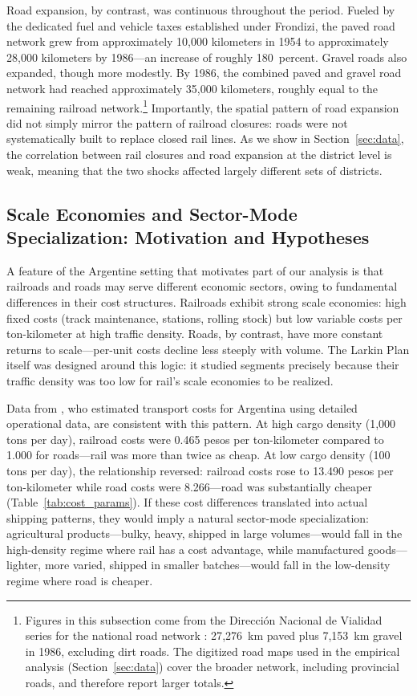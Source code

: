 Road expansion, by contrast, was continuous throughout the period.
Fueled by the dedicated fuel and vehicle taxes established under
Frondizi, the paved road network grew from approximately
10{,}000 kilometers in 1954 to approximately 28{,}000 kilometers by
1986—an increase of roughly 180~percent. Gravel roads also expanded,
though more modestly. By 1986, the combined paved and gravel road
network had reached approximately 35{,}000 kilometers, roughly equal
to the remaining railroad network.\footnote{Figures in this
subsection come from the Dirección Nacional de Vialidad series for
the national road network \citep{dnvseries}: 27{,}276~km paved plus
7{,}153~km gravel in 1986, excluding dirt roads. The digitized road
maps used in the empirical analysis (Section~\ref{sec:data}) cover
the broader network, including provincial roads, and therefore
report larger totals.} Importantly, the spatial pattern
of road expansion did not simply mirror the pattern of railroad
closures: roads were not systematically built to replace closed rail
lines. As we show in Section~\ref{sec:data}, the correlation between
rail closures and road expansion at the district level is weak,
meaning that the two shocks affected largely different sets of
districts.

\subsection{Scale Economies and Sector-Mode Specialization:
            Motivation and Hypotheses}
\label{ssec:scale_economies}

A feature of the Argentine setting that motivates part of our
analysis is that railroads and roads may serve different economic
sectors, owing to fundamental differences in their cost structures.
Railroads exhibit strong scale economies: high fixed costs (track
maintenance, stations, rolling stock) but low variable costs per
ton-kilometer at high traffic density. Roads, by contrast, have more
constant returns to scale—per-unit costs decline less steeply with
volume. The Larkin Plan itself was designed around this logic: it
studied segments precisely because their traffic density was too low
for rail's scale economies to be realized.

Data from \citet{baumgartnerpalazzo1969}, who estimated transport
costs for Argentina using detailed operational data, are consistent
with this pattern. At high cargo density (1{,}000 tons per day),
railroad costs were 0.465 pesos per ton-kilometer compared to 1.000
for roads—rail was more than twice as cheap. At low cargo density
(100 tons per day), the relationship reversed: railroad costs rose
to 13.490 pesos per ton-kilometer while road costs were 8.266—road
was substantially cheaper (Table~\ref{tab:cost_params}). If these
cost differences translated into actual shipping patterns, they
would imply a natural sector-mode specialization: agricultural
products—bulky, heavy, shipped in large volumes—would fall in the
high-density regime where rail has a cost advantage, while
manufactured goods—lighter, more varied, shipped in smaller
batches—would fall in the low-density regime where road is cheaper.

